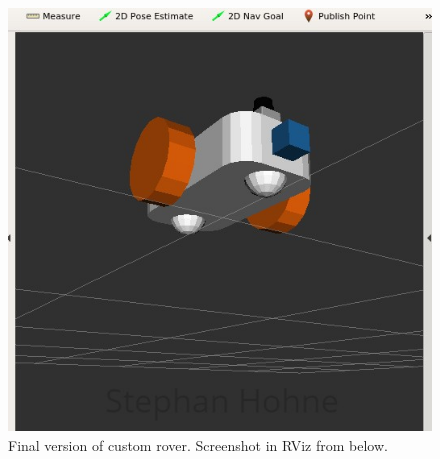 \documentclass[10pt,journal,compsoc]{IEEEtran}
\begin{document}
\begin{figure}[thpb]
      \centering
      \includegraphics[width=\columnwidth]{images/rover_version_3_rviz_below.png}
      \caption{Final version of custom rover. Screenshot in RViz from below.}
      \label{fig:rover_3_rviz}
\end{figure}
\end{document}
